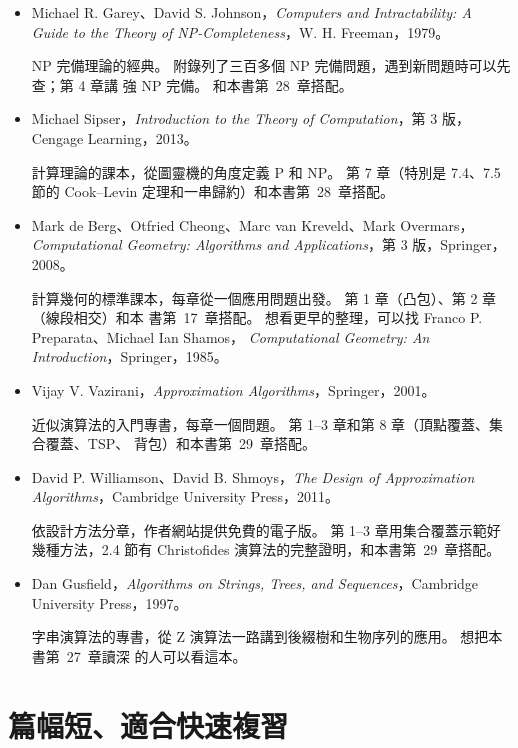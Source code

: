 \begin{itemize}
\item Michael R. Garey、David S. Johnson，\textit{Computers and Intractability: A
Guide to the Theory of NP-Completeness}，W. H. Freeman，1979。

NP 完備理論的經典。 附錄列了三百多個 NP 完備問題，遇到新問題時可以先查；第 4 章講
強 NP 完備。 和本書第~28~章搭配。

\item Michael Sipser，\textit{Introduction to the Theory of Computation}，第 3 版，
Cengage Learning，2013。

計算理論的課本，從圖靈機的角度定義 P 和 NP。 第 7 章（特別是 7.4、7.5 節的 Cook--Levin
定理和一串歸約）和本書第~28~章搭配。

\item Mark de Berg、Otfried Cheong、Marc van Kreveld、Mark Overmars，\textit{Computational
Geometry: Algorithms and Applications}，第 3 版，Springer，2008。

計算幾何的標準課本，每章從一個應用問題出發。 第 1 章（凸包）、第 2 章（線段相交）和本
書第~17~章搭配。 想看更早的整理，可以找 Franco P. Preparata、Michael Ian Shamos，
\textit{Computational Geometry: An Introduction}，Springer，1985。

\item Vijay V. Vazirani，\textit{Approximation Algorithms}，Springer，2001。

近似演算法的入門專書，每章一個問題。 第 1--3 章和第 8 章（頂點覆蓋、集合覆蓋、TSP、
背包）和本書第~29~章搭配。

\item David P. Williamson、David B. Shmoys，\textit{The Design of Approximation
Algorithms}，Cambridge University Press，2011。

依設計方法分章，作者網站提供免費的電子版。 第 1--3 章用集合覆蓋示範好幾種方法，2.4
節有 Christofides 演算法的完整證明，和本書第~29~章搭配。

\item Dan Gusfield，\textit{Algorithms on Strings, Trees, and Sequences}，Cambridge
University Press，1997。

字串演算法的專書，從 Z 演算法一路講到後綴樹和生物序列的應用。 想把本書第~27~章讀深
的人可以看這本。
\end{itemize}

\section*{篇幅短、適合快速複習}

